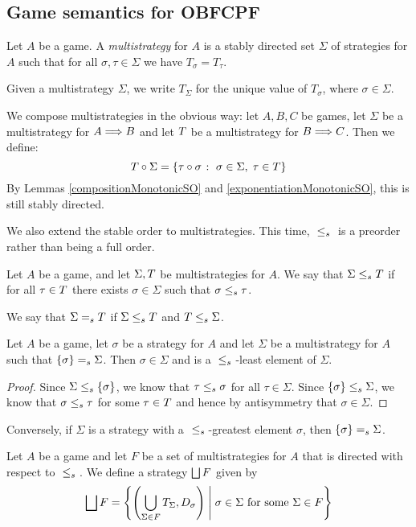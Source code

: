 \documentclass{article}
\begin{document}
\subsection{Game semantics for OBFCPF}

\begin{definition}
  Let $A$ be a game.  A \emph{multistrategy} for $A$ is a stably directed set $\Sigma$ of strategies for $A$ such that for all $\sigma,\tau\in \Sigma$ we have $T_\sigma=T_\tau$.

  Given a multistrategy $\Sigma$, we write $T_\Sigma$ for the unique value of $T_\sigma$, where $\sigma\in\Sigma$.

  We compose multistrategies in the obvious way: let $A,B,C$ be games, let $\Sigma$ be a multistrategy for $A\Longrightarrow B$ and let $T$ be a multistrategy for $B\Longrightarrow C$.  Then we define:
  \[
    T \circ \Sigma = \{\tau \circ \sigma\;\colon\;\sigma\in\Sigma,\;\tau\in T\}
    \]
  By Lemmas \ref{compositionMonotonicSO} and \ref{exponentiationMonotonicSO}, this is still stably directed.

  We also extend the stable order to multistrategies.  This time, ${\;\le_s\;}$ is a preorder rather than being a full order.

  Let $A$ be a game, and let $\Sigma,T$ be multistrategies for $A$.  We say that $\Sigma{\;\le_s\;}T$ if for all $\tau\in T$ there exists $\sigma\in\Sigma$ such that $\sigma{\;\le_s\;}\tau$.

  We say that $\Sigma {\;=_s\;} T$ if $\Sigma{\;\le_s\;}T$ and $T{\;\le_s\;}\Sigma$.
\end{definition}

\begin{lemma}
  Let $A$ be a game, let $\sigma$ be a strategy for $A$ and let $\Sigma$ be a multistrategy for $A$ such that $\{\sigma\}{\;=_s\;}\Sigma$.  Then $\sigma\in\Sigma$ and is a ${\;\le_s\;}$-least element of $\Sigma$.
  \begin{proof}
    Since $\Sigma{\;\le_s\;}\{\sigma\}$, we know that $\tau{\;\le_s\;}\sigma$ for all $\tau\in\Sigma$.  Since $\{\sigma\}{\;\le_s\;}\Sigma$, we know that $\sigma{\;\le_s\;}\tau$ for some $\tau\in T$ and hence by antisymmetry that $\sigma\in\Sigma$.
  \end{proof}
\end{lemma}

Conversely, if $\Sigma$ is a strategy with a ${\;\le_s\;}$-greatest element $\sigma$, then $\{\sigma\}{\;=_s\;}\Sigma$.

\begin{definition}
  Let $A$ be a game and let $F$ be a set of multistrategies for $A$ that is directed with respect to ${\;\le_s\;}$.  We define a strategy $\bigsqcup F$ given by
  \[
    \bigsqcup F = \left\{\left(\bigcup_{\Sigma\in F} T_\Sigma, D_\sigma\right)\;\middle|\;\textrm{$\sigma\in\Sigma$ for some $\Sigma\in F$}\right\}
    \]
\end{definition}
\end{document}
